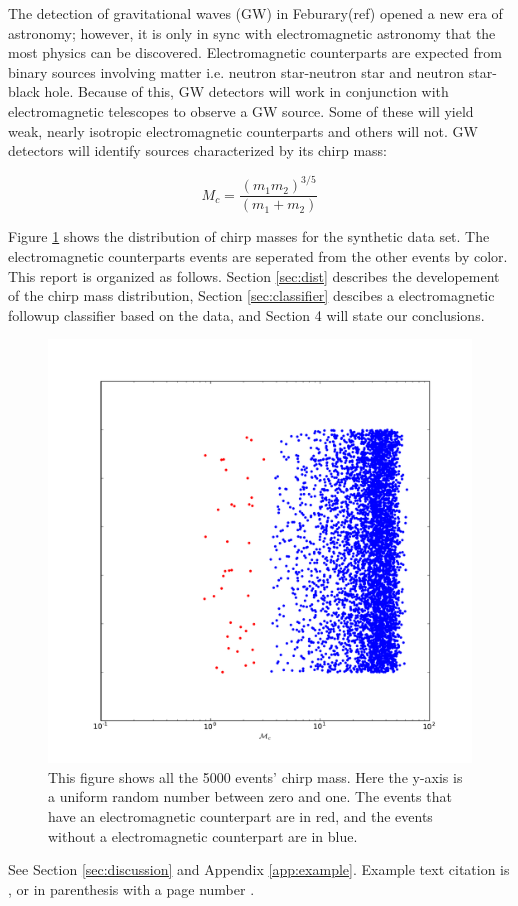 The detection of gravitational waves (GW) in Feburary(ref) opened a new era of astronomy; however, it is only in sync with electromagnetic astronomy that the most physics can be discovered. Electromagnetic counterparts are expected from binary sources involving matter i.e. neutron star-neutron star and neutron star-black hole. Because of this, GW detectors will work in conjunction with electromagnetic telescopes to observe a GW source. Some of these will yield weak, nearly isotropic electromagnetic counterparts and others will not. GW detectors will identify sources characterized by its chirp mass:

\begin{equation}
\label{chirp_mass}
M_{c}=\frac{(m_{1}m_{2})^{3/5}}{(m_{1}+m_{2})}
\end{equation}

Figure \ref{fig:chirp} shows the distribution of chirp masses for the synthetic data set. The electromagnetic counterparts events are seperated from the other events by color. This report is organized as follows. Section \ref{sec:dist} describes the developement of the chirp mass distribution, Section \ref{sec:classifier} descibes a electromagnetic followup classifier based on the data, and Section 4 will state our conclusions.
\begin{figure}
\includegraphics[width=\columnwidth]{output/jake/chirp-mass-classes.pdf}
\caption{This figure shows all the 5000 events' chirp mass. Here the y-axis is a uniform random number between zero and one. The events that have an electromagnetic counterpart are in red, and the events without a electromagnetic counterpart are in blue.}
\label{fig:chirp}
\end{figure}
See Section \ref{sec:discussion} and Appendix \ref{app:example}. Example text citation is \textcite{2012ApJ...759...52D}, or in parenthesis with a page number \parencite[pg 2]{2012ApJ...759...52D}.

